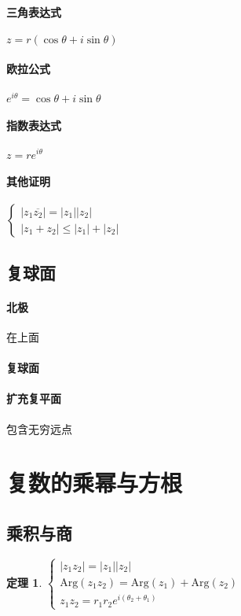 \documentclass[UTF8,a4paper,12pt,scheme=chinese]{ctexbook}
\newcommand{\Arg}{\mathrm{Arg}}
\newtheorem{theorem}{定理}[chapter]
\theoremstyle{plain}
\begin{document}
	\paragraph{三角表达式}$ z=r(\cos\theta+i\sin\theta) $
	\paragraph{欧拉公式}$ e^{i\theta}=\cos\theta+i\sin\theta $
	\paragraph{指数表达式}$ z=re^{i\theta} $
	\paragraph{其他证明}$\left\lbrace
	\begin{array}{l} |z_1\overline{z_2}|=|z_1||z_2|\\
	|z_1+z_2|\leqslant|z_1|+|z_2|
	\end{array}
	\right. $
	\subsection{复球面}
	\paragraph{北极}在上面
	\paragraph{复球面}
	\paragraph{扩充复平面}包含无穷远点
	\section{复数的乘幂与方根}
	\subsection{乘积与商}
	\begin{theorem}
		$\left\lbrace
		\begin{array}{l} 
		|z_1z_2|=|z_1||z_2|\\
		\Arg(z_1z_2)=\Arg(z_1)+\Arg(z_2)\\
		z_1z_2=r_1r_2e^{i(\theta_2+\theta_1)}
		\end{array}
		\right. $
	\end{theorem}
\end{document}
